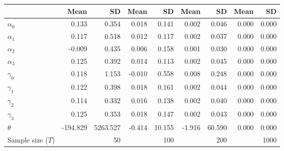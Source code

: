 
\begin{tabular}[t]{lrrrrrrrr}
\toprule
  & Mean & SD & Mean  & SD  & Mean   & SD   & Mean    & SD   \\
\midrule
$\alpha_{0}$ & 0.133 & 0.354 & 0.018 & 0.141 & 0.002 & 0.046 & 0.000 & 0.000\\
$\alpha_{1}$ & 0.117 & 0.518 & 0.012 & 0.117 & 0.002 & 0.037 & 0.000 & 0.000\\
$\alpha_{2}$ & -0.009 & 0.435 & 0.006 & 0.158 & 0.001 & 0.030 & 0.000 & 0.000\\
$\alpha_{3}$ & 0.125 & 0.392 & 0.014 & 0.113 & 0.002 & 0.045 & 0.000 & 0.000\\
$\gamma_{0}$ & 0.118 & 1.153 & -0.010 & 0.558 & 0.008 & 0.248 & 0.000 & 0.000\\
$\gamma_{1}$ & 0.122 & 0.398 & 0.018 & 0.161 & 0.002 & 0.044 & 0.000 & 0.000\\
$\gamma_{2}$ & 0.114 & 0.332 & 0.016 & 0.138 & 0.002 & 0.040 & 0.000 & 0.000\\
$\gamma_{3}$ & 0.125 & 0.353 & 0.018 & 0.147 & 0.002 & 0.043 & 0.000 & 0.000\\
$\theta$ & -194.829 & 5263.527 & -0.414 & 10.155 & -1.916 & 60.590 & 0.000 & 0.000\\
Sample size ($T$) &  & 50 &  & 100 &  & 200 &  & 1000\\
\bottomrule
\end{tabular}
